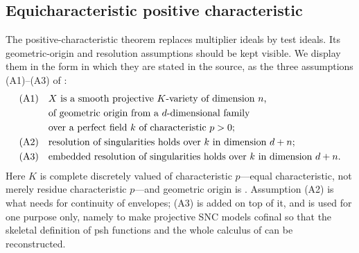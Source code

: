 \subsection{Equicharacteristic positive characteristic}
\label{sec:ch29-later-positive}

The positive-characteristic theorem replaces multiplier ideals by test
ideals.  Its geometric-origin and resolution assumptions should be kept
visible.  We display them in the form in which they are stated in the
source, as the three assumptions \textup{(A1)}--\textup{(A3)} of
\cite[\S9]{GJKM19}:
\begin{equation}
\label{eq:ch29-gjkm-assumptions}
\begin{aligned}
 \textup{(A1)}\quad&\text{\(X\) is a smooth projective \(K\)-variety of
   dimension \(n\),}\\
 &\text{of geometric origin from a \(d\)-dimensional family}\\
 &\text{over a perfect field \(k\) of characteristic \(p>0\); }\\
 \textup{(A2)}\quad&\text{resolution of singularities holds over \(k\) in
   dimension \(d+n\);}\\
 \textup{(A3)}\quad&\text{embedded resolution of singularities holds over
   \(k\) in dimension \(d+n\).}
\end{aligned}
\end{equation}
Here \(K\) is complete discretely valued of characteristic \(p\)---equal
characteristic, not merely residue characteristic \(p\)---and geometric
origin is .  Assumption \textup{(A2)} is
what  needs for continuity of
envelopes; \textup{(A3)} is added on top of it, and is used for one purpose
only, namely to make projective SNC models cofinal so that the skeletal
definition of psh functions and the whole calculus of
 can be
reconstructed.

